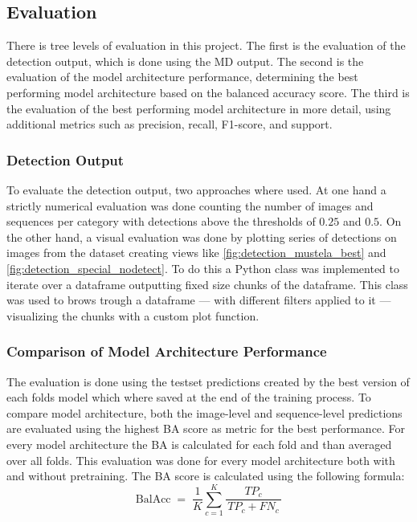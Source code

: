     \subsection{Evaluation}
    There is tree levels of evaluation in this project.
    The first is the evaluation of the detection output, which is done using the \ac{MD} output.
    The second is the evaluation of the model architecture performance, determining the best performing model architecture based on the balanced accuracy score.
    The third is the evaluation of the best performing model architecture in more detail, using additional metrics such as precision, recall, F1-score, and support.

    \subsubsection{Detection Output}
    To evaluate the detection output, two approaches where used.
    At one hand a strictly numerical evaluation was done counting the number of images and sequences per category with detections above the thresholds of \(0.25\) and \(0.5\).
    On the other hand, a visual evaluation was done by plotting series of detections on images from the dataset creating views like \autoref{fig:detection_mustela_best} and \autoref{fig:detection_special_nodetect}.
    To do this a Python class was implemented to iterate over a dataframe outputting fixed size chunks of the dataframe.
    This class was used to brows trough a dataframe --- with different filters applied to it --- visualizing the chunks with a custom plot function.

    \subsubsection{Comparison of Model Architecture Performance}
    The evaluation is done using the testset predictions created by the best version of each folds model which where saved at the end of the training process.
    To compare model architecture, both the image-level and sequence-level predictions are evaluated using the highest \ac{BA} score as metric for the best performance.
    For every model architecture the \ac{BA} is calculated for each fold and than averaged over all folds.
    This evaluation was done for every model architecture both with and without pretraining.
    The \ac{BA} score is calculated using the following formula:
    \begin{equation}
    \text{BalAcc}
    \;=\;
    \frac{1}{K} \sum_{c=1}^{K}
        \frac{TP_{c}}{\,TP_{c} + FN_{c}\,}
    \end{equation}


